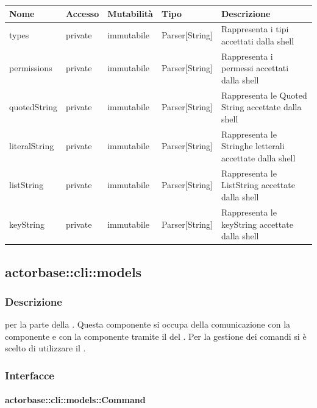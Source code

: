 \documentclass{scalatekids-article}
\begin{document}
\begin{tabular}{| p{2.5cm} | p{1.5cm} | p{2cm} | p{2.5cm} | p{8.5cm} |}
  \hline
  Nome & Accesso & Mutabilità & Tipo & Descrizione\\
  \hline
  types & private & immutabile & Parser[String] & Rappresenta i tipi accettati dalla shell\\
  \hline
  permissions & private & immutabile & Parser[String] & Rappresenta i permessi accettati dalla shell\\
  \hline
  quotedString & private & immutabile & Parser[String] & Rappresenta le Quoted String accettate dalla shell\\
  \hline
  literalString & private & immutabile & Parser[String] & Rappresenta le Stringhe letterali accettate dalla shell\\
  \hline
  listString & private & immutabile & Parser[String] & Rappresenta le ListString accettate dalla shell\\
  \hline
  keyString & private & immutabile & Parser[String] & Rappresenta le keyString accettate dalla shell\\
  \hline
\end{tabular}

\subsection{actorbase::cli::models}
\label{sec:actorbase::cli::models}

\subsubsection{Descrizione}

 per la parte  della . Questa
componente si occupa della comunicazione con la componente  e
con la componente  tramite il  del  . Per la gestione dei comandi si è scelto di
utilizzare il .

\subsubsection{Interfacce}

\paragraph{actorbase::cli::models::Command}
\label{sec:actorbase::cli::models::Command}
\end{document}
